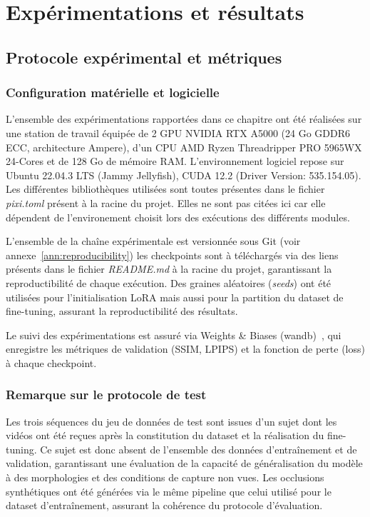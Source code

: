 \chapter{Expérimentations et résultats} \label{ch_five}

\section{Protocole expérimental et métriques}

\subsection{Configuration matérielle et logicielle}

L'ensemble des expérimentations rapportées dans ce chapitre ont été réalisées sur une station de travail équipée de 2 GPU NVIDIA RTX A5000 (24 Go GDDR6 ECC, architecture Ampere), d'un CPU AMD Ryzen Threadripper PRO 5965WX 24-Cores et de 128 Go de mémoire RAM. L'environnement logiciel repose sur Ubuntu 22.04.3 LTS (Jammy Jellyfish), CUDA 12.2 (Driver Version: 535.154.05). Les différentes bibliothèques utilisées sont toutes présentes dans le fichier \emph{pixi.toml} présent à la racine du projet. Elles ne sont pas citées ici car elle dépendent de l'environement choisit lors des exécutions des différents modules.

L'ensemble de la chaîne expérimentale est versionnée sous Git (voir annexe~\ref{ann:reproducibility}) les checkpoints sont à téléchargés via des liens présents dans le fichier \emph{README.md} à la racine du projet, garantissant la reproductibilité de chaque exécution. Des graines aléatoires (\emph{seeds}) ont été utilisées pour l'initialisation LoRA mais aussi pour la partition du dataset de fine-tuning, assurant la reproductibilité des résultats.

Le suivi des expérimentations est assuré via Weights \& Biases (wandb)~\cite{wandb}, qui enregistre les métriques de validation (SSIM, LPIPS) et la fonction de perte (loss) à chaque checkpoint.

\subsection*{Remarque sur le protocole de test}

Les trois séquences du jeu de données de test sont issues d'un sujet dont les vidéos ont été reçues après la constitution du dataset et la réalisation du fine-tuning. Ce sujet est donc absent de l'ensemble des données d'entraînement et de validation, garantissant une évaluation de la capacité de généralisation du modèle à des morphologies et des conditions de capture non vues. Les occlusions synthétiques ont été générées via le même pipeline que celui utilisé pour le dataset d'entraînement, assurant la cohérence du protocole d'évaluation.

